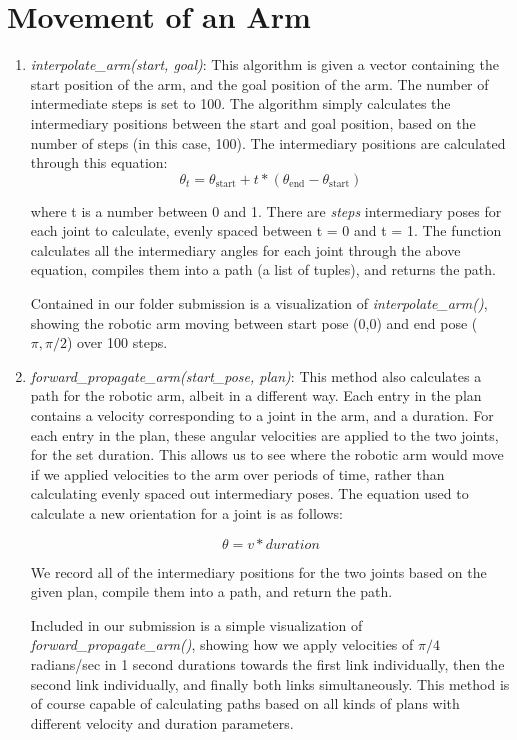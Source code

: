 \documentclass{article}
\begin{document}
\section{Movement of an Arm}
\begin{enumerate}
    \item \textit{interpolate\_arm(start, goal)}: %
    This algorithm is given a vector containing the start position of the arm, and the goal position of the arm. The number of intermediate steps is set to 100. The algorithm simply calculates the intermediary positions between the start and goal position, based on the number of steps (in this case, 100). The intermediary positions are calculated through this equation: 
\[\theta_t = \theta_{\text{start}} + t * (\theta_{\text{end}} - \theta_{\text{start}})\]

    where t is a number between 0 and 1. There are \textit{steps} intermediary poses for each joint to calculate, evenly spaced between t = 0 and t = 1. The function calculates all the intermediary angles for each joint through the above equation, compiles them into a path (a list of tuples), and returns the path.

    Contained in our folder submission is a visualization of \textit{interpolate\_arm()}, showing the robotic arm moving between start pose (0,0) and end pose (\(\pi, \pi/2\)) over 100 steps.

    \item \textit{forward\_propagate\_arm(start\_pose, plan)}: 
    This method also calculates a path for the robotic arm, albeit in a different way. Each entry in the plan contains a velocity corresponding to a joint in the arm, and a duration. For each entry in the plan, these angular velocities are applied to the two joints, for the set duration. This allows us to see where the robotic arm would move if we applied velocities to the arm over periods of time, rather than calculating evenly spaced out intermediary poses. The equation used to calculate a new orientation for a joint is as follows:
    
\[\theta = v * duration\]

    We record all of the intermediary positions for the two joints based on the given plan, compile them into a path, and return the path.

    Included in our submission is a simple visualization of \textit{forward\_propagate\_arm()}, showing how we apply velocities of \(\pi/4\) radians/sec in 1 second durations towards the first link individually, then the second link individually, and finally both links simultaneously. This method is of course capable of calculating paths based on all kinds of plans with different velocity and duration parameters. 


\end{enumerate}
\end{document}
